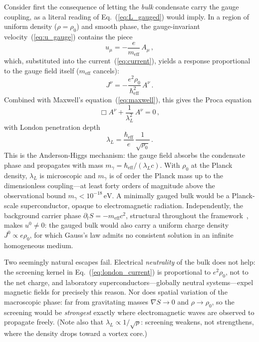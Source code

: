 \documentclass[12pt, a4paper]{article}
\newcommand{\meff}{m_{\mathrm{eff}}}
\newcommand{\heff}{\hbar_{\mathrm{eff}}}
\begin{document}
Consider first the consequence of letting the \emph{bulk} condensate carry the gauge coupling, as a literal reading of Eq.~(\ref{eq:L_gauged}) would imply. In a region of uniform density ($\rho = \rho_0$) and smooth phase, the gauge-invariant velocity~(\ref{eq:u_gauge}) contains the piece
\begin{equation}
    u_\mu = -\frac{e}{\meff}\,A_\mu\,,
\label{eq:london_velocity}
\end{equation}
which, substituted into the current~(\ref{eq:current}), yields a response proportional to the gauge field itself ($\meff$ cancels):
\begin{equation}
    J^\nu = -\frac{e^2\rho_0}{\heff^2}\,A^\nu\,.
\label{eq:london_current}
\end{equation}
Combined with Maxwell's equation~(\ref{eq:maxwell}), this gives the Proca equation
\begin{equation}
    \Box A^\nu + \frac{1}{\lambda_L^2}\,A^\nu = 0\,,
\label{eq:proca}
\end{equation}
with London penetration depth
\begin{equation}
    \lambda_L = \frac{\heff}{e}\,
    \frac{1}{\sqrt{\rho_0}}\,.
\label{eq:london_depth}
\end{equation}
This is the Anderson-Higgs mechanism: the gauge field absorbs the condensate phase and propagates with mass $m_\gamma = \heff/(\lambda_L c)$. With $\rho_0$ at the Planck density, $\lambda_L$ is microscopic and $m_\gamma$ is of order the Planck mass up to the dimensionless coupling---at least forty orders of magnitude above the observational bound $m_\gamma < 10^{-18}\,\mathrm{eV}$. A minimally gauged bulk would be a Planck-scale superconductor, opaque to electromagnetic radiation. Independently, the background carrier phase $\partial_t S = -\meff c^2$, structural throughout the framework~\cite{kulangiev_2026a}, makes $u^0 \neq 0$: the gauged bulk would also carry a uniform charge density $J^0 \propto e\rho_0$, for which Gauss's law admits no consistent solution in an infinite homogeneous medium.

Two seemingly natural escapes fail. Electrical \emph{neutrality} of the bulk does not help: the screening kernel in Eq.~(\ref{eq:london_current}) is proportional to $e^2\rho_0$, not to the net charge, and laboratory superconductors---globally neutral systems---expel magnetic fields for precisely this reason. Nor does spatial variation of the macroscopic phase: far from gravitating masses $\nabla S \to 0$ and $\rho \to \rho_0$, so the screening would be \emph{strongest} exactly where electromagnetic waves are observed to propagate freely. (Note also that $\lambda_L \propto 1/\sqrt{\rho}$: screening weakens, not strengthens, where the density drops toward a vortex core.)
\end{document}
